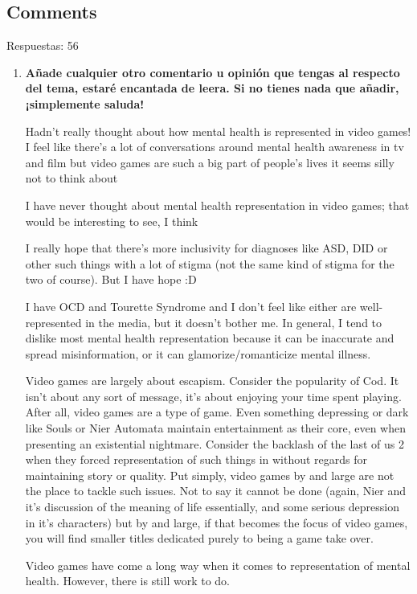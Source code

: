\documentclass[12pt, a4paper,twoside,titlepage]{book}
\begin{document}
\subsection{Comments}
Respuestas: 56
\begin{enumerate}[label=\textbf{\arabic*}.]
     \item \textbf{Añade cualquier otro comentario u opinión que tengas al respecto del tema, estaré encantada de leera. Si no tienes nada que añadir, ¡simplemente saluda!}\\
     \label{comentariosIngles}
     
        Hadn’t really thought about how mental health is represented in video games! I feel like there’s a lot of conversations around mental health awareness in tv and film but video games are such a big part of people’s lives it seems silly not to think about
        
        I have never thought about mental health representation in video games; that would be interesting to see, I think
        
        I really hope that there's more inclusivity for diagnoses like ASD, DID or other such things with a lot of stigma (not the same kind of stigma for the two of course). But I have hope :D 
        
        I have OCD and Tourette Syndrome and I don't feel like either are well-represented in the media, but it doesn't bother me. In general, I tend to dislike most mental health representation because it can be inaccurate and spread misinformation, or it can glamorize/romanticize mental illness.
        
        Video games are largely about escapism. Consider the popularity of Cod. It isn't about any sort of message, it's about enjoying your time spent playing. After all, video games are a type of game. Even something depressing or dark like Souls or Nier Automata maintain entertainment as their core, even when presenting an existential nightmare. Consider the backlash of the last of us 2 when they forced representation of such things in without regards for maintaining story or quality. Put simply, video games by and large are not the place to tackle such issues. Not to say it cannot be done (again, Nier and it's discussion of the meaning of life essentially, and some serious depression in it's characters) but by and large, if that becomes the focus of video games, you will find smaller titles dedicated purely to being a game take over.
        
        Video games have come a long way when it comes to representation of mental health. However, there is still work to do.
        

\end{enumerate}
\end{document}
